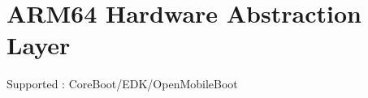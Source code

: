 \chapter{ARM64 Hardware Abstraction Layer}
\hypertarget{md_dev_2_kernel_2_h_a_l_kit_2_a_r_m64_2_read_me}{}\label{md_dev_2_kernel_2_h_a_l_kit_2_a_r_m64_2_read_me}
\label{md_dev_2_kernel_2_h_a_l_kit_2_a_r_m64_2_read_me_autotoc_md20}%
%

\begin{DoxyItemize}
\item Supported \+: Core\+Boot/\+EDK/\+Open\+Mobile\+Boot 
\end{DoxyItemize}
